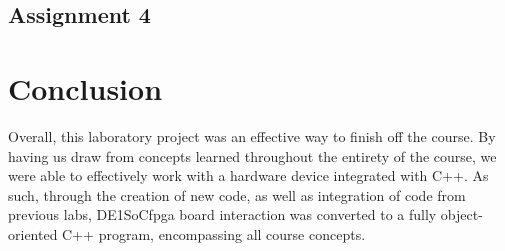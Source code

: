 \documentclass[
	letterpaper, %
	10pt, %
]{CSUniSchoolLabReport}
\begin{document}
%

\subsection{Assignment 4}

\section{Conclusion}

Overall, this laboratory project was an effective way to finish off the course. By having us draw from concepts learned throughout the entirety of the course, we were able to effectively work with a hardware device integrated with C++. As such, through the creation of new code, as well as integration of code from previous labs, DE1SoCfpga board interaction was converted to a fully object-oriented C++ program, encompassing all course concepts.
\end{document}
